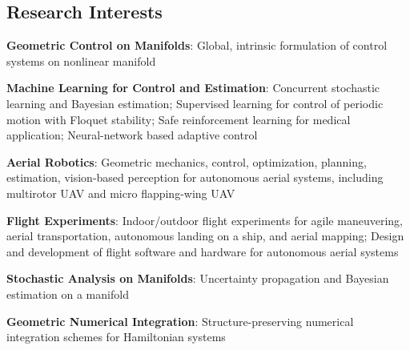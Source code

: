 \documentclass[10pt]{article}
\begin{document}
\vspace*{0.2cm}

\subsection*{Research Interests}
\begin{list}{}%
{\setlength{\leftmargin}{1.0cm}\setlength{\itemindent}{-0.5cm}
\setlength{\parsep}{0cm}\setlength{\itemsep}{0.12cm}\setlength{\parskip}{0cm}\setlength{\topsep}{0cm}\setlength{\partopsep}{0cm}}

\item \textbf{Geometric Control on Manifolds}: Global, intrinsic formulation of control systems on nonlinear manifold 
\item \textbf{Machine Learning for Control and Estimation}: Concurrent stochastic learning and Bayesian estimation; Supervised learning for control of periodic motion with Floquet stability; Safe reinforcement learning for medical application; Neural-network based adaptive control\\[-0.2cm]

\item \textbf{Aerial Robotics}: Geometric mechanics, control, optimization, planning, estimation, vision-based perception for autonomous aerial systems, including multirotor UAV and micro flapping-wing UAV

\item \textbf{Flight Experiments}: Indoor/outdoor flight experiments for agile maneuvering, aerial transportation, autonomous landing on a ship, and aerial mapping; Design and development of flight software and hardware for autonomous aerial systems \\[-0.1cm]

\item \textbf{Stochastic Analysis on Manifolds}: Uncertainty propagation and Bayesian estimation on a manifold
\item \textbf{Geometric Numerical Integration}: Structure-preserving numerical integration schemes for Hamiltonian systems


\vspace*{0.2cm}




\end{list}
\end{document}
